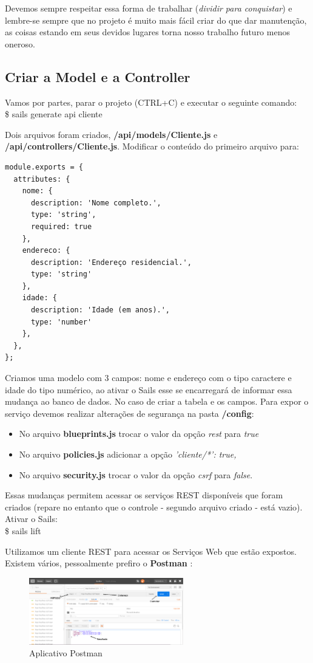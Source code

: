 \documentclass[a4paper,11pt]{article}
\begin{document}
Devemos sempre respeitar essa forma de trabalhar (\textit{dividir para conquistar}) e lembre-se sempre que no projeto é muito mais fácil criar do que dar manutenção, as coisas estando em seus devidos lugares torna nosso trabalho futuro menos oneroso.

\subsection{Criar a Model e a Controller}
Vamos por partes, parar o projeto (CTRL+C) e executar o seguinte comando: \\
{\ttfamily\$ sails generate api cliente}

Dois arquivos foram criados, \textbf{/api/models/Cliente.js} e \textbf{/api/controllers/Cliente.js}. Modificar o conteúdo do primeiro arquivo para:
\begin{lstlisting}
module.exports = {
  attributes: {
    nome: { 
      description: 'Nome completo.',
      type: 'string', 
      required: true 
    },
    endereco: { 
      description: 'Endereço residencial.',
      type: 'string' 
    },
    idade: { 
      description: 'Idade (em anos).',
      type: 'number' 
    },
  },
};
\end{lstlisting}

Criamos uma modelo com 3 campos: nome e endereço com o tipo caractere e idade do tipo numérico, ao ativar o Sails esse se encarregará de informar essa mudança ao banco de dados. No caso de criar a tabela e os campos. Para expor o serviço devemos realizar alterações de segurança na pasta \textbf{/config}: \vspace{-1em}
\begin{itemize}
	\item No arquivo \textbf{blueprints.js} trocar o valor da opção \textit{rest} para \textit{true}
	\item No arquivo \textbf{policies.js} adicionar a opção \textit{'cliente/*': true,}
	\item No arquivo \textbf{security.js}  trocar o valor da opção \textit{csrf} para \textit{false}.
\end{itemize}

Essas mudanças permitem acessar os serviços REST disponíveis que foram criados (repare no entanto que o controle - segundo arquivo criado - está vazio). Ativar o Sails: \\
{\ttfamily\$ sails lift}

Utilizamos um cliente REST para acessar os Serviços Web que estão expostos. Existem vários, pessoalmente prefiro o \textbf{Postman} \cite{postman}:
\begin{figure}[H]
	\centering
	\includegraphics[width=0.6\textwidth]{imagens/Postman.png}
	\caption{Aplicativo Postman}
\end{figure}
\end{document}
